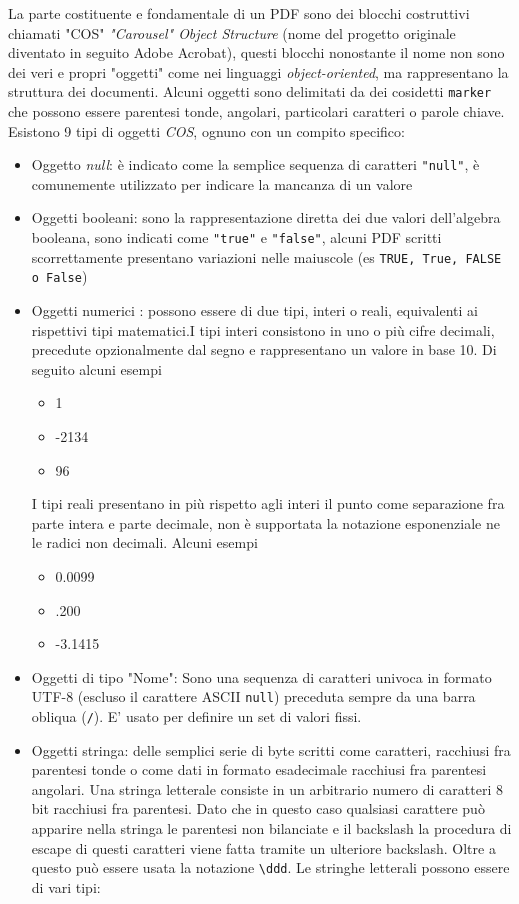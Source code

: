 La parte costituente e fondamentale di un PDF sono dei blocchi costruttivi chiamati "COS" \textit{"Carousel" Object Structure} (nome del progetto originale diventato in seguito Adobe Acrobat), questi blocchi nonostante il nome non sono dei veri e propri "oggetti" come nei linguaggi \textit{object-oriented}, ma rappresentano la struttura dei documenti.
Alcuni oggetti sono delimitati da dei cosidetti \texttt{marker} che possono essere parentesi tonde, angolari, particolari caratteri o parole chiave.
Esistono 9 tipi di oggetti \textit{COS}, ognuno con un compito specifico:
\begin{itemize}
	\item Oggetto \textit{null}: è indicato come la semplice sequenza di caratteri \texttt{"null"}, è comunemente utilizzato per indicare la mancanza di un valore
	\item Oggetti booleani: sono la rappresentazione diretta dei due valori dell'algebra booleana, sono indicati come \texttt{"true"} e \texttt{"false"}, alcuni PDF scritti scorrettamente presentano variazioni nelle maiuscole (es \texttt{TRUE, True, FALSE o False})
	\item Oggetti numerici : possono essere di due tipi, interi o reali, equivalenti ai rispettivi tipi matematici.\newline I tipi interi consistono in uno o più cifre decimali, precedute opzionalmente dal segno e rappresentano un valore in base 10. Di seguito alcuni esempi
	 \begin{itemize} 
	 	\item 1 
	 	\item -2134
	 	\item 96
	 \end{itemize}
	 I tipi reali presentano in più rispetto agli interi il punto come separazione fra parte intera e parte decimale, non è supportata la notazione esponenziale ne le radici non decimali. Alcuni esempi
	 \begin{itemize}
	 \item 0.0099
	 \item .200
	 \item -3.1415
	 \end{itemize}
	 \item Oggetti di tipo "Nome": Sono una sequenza di caratteri univoca in formato UTF-8 (escluso il carattere ASCII \texttt{null}) preceduta sempre da una barra obliqua (\texttt{/}). E' usato per definire un set di valori fissi.
	 \item Oggetti stringa: delle semplici serie di byte scritti come caratteri, racchiusi fra parentesi tonde o come dati in formato esadecimale racchiusi fra parentesi angolari. Una stringa letterale consiste in un arbitrario numero di caratteri 8 bit racchiusi fra parentesi. Dato che in questo caso qualsiasi carattere può apparire nella stringa le parentesi non bilanciate e il backslash la procedura di escape di questi caratteri viene fatta tramite un ulteriore backslash. Oltre a questo può essere usata la notazione \texttt{\textbackslash ddd}. Le stringhe letterali possono essere di vari tipi:

\end{itemize}
